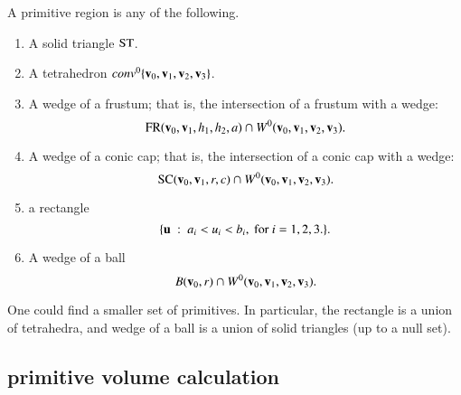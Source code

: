 \begin{definition}[primitive]\label{def:primitive} 
A primitive region is any of the following.

\begin{enumerate}%
\item A solid triangle ${\operatorname{ST}}$.
%
\item A tetrahedron $conv^0\{{\mathbf v}_0,{\mathbf v}_1,{\mathbf v}_2,{\mathbf v}_3\}$.
\item A wedge of a frustum;
that is, the intersection of a frustum with
a wedge:
\begin{displaymath}
{\operatorname{FR}}({\mathbf v}_0,{\mathbf v}_1,h_1,h_2,a) \cap W^0({\mathbf v}_0,{\mathbf v}_1,{\mathbf v}_2,{\mathbf v}_3).
\end{displaymath}
\item A wedge of a conic cap; that is, the intersection of a conic cap
with
a wedge:
\begin{displaymath}
{\operatorname{SC}}({\mathbf v}_0,{\mathbf v}_1,r,c) \cap W^0({\mathbf v}_0,{\mathbf v}_1,{\mathbf v}_2,{\mathbf v}_3).
\end{displaymath}
\item a rectangle
\begin{displaymath}
\{{\mathbf u} \ :\  a_i < u_i < b_i,\text { for } i=1,2,3.\}.
\end{displaymath}
\item A wedge of a ball
\begin{displaymath}
B({\mathbf v}_0,r) \cap W^0({\mathbf v}_0,{\mathbf v}_1,{\mathbf v}_2,{\mathbf v}_3).
\end{displaymath}
%
%
%
%
%
%
%
\end{enumerate}
One could find a smaller set of primitives.  In particular, the
rectangle is a union of tetrahedra, and wedge of a ball is a union of
solid triangles (up to a null set).

\end{definition}

\subsection{primitive volume calculation}\label{sec:primitive}

